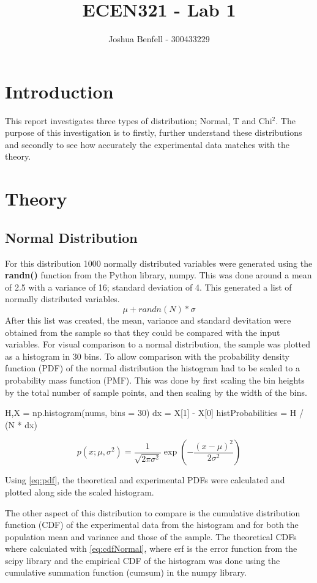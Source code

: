\documentclass[a4paper, 12pt]{article}
\title{ECEN321 - Lab 1}
\author{Joshua Benfell - 300433229}
\begin{document}
	\maketitle
    
    \section{Introduction}
        This report investigates three types of distribution; Normal, T and Chi$^2$. The purpose of this investigation is to firstly, further understand these distributions and secondly to see how accurately the experimental data matches with the theory.
    \section{Theory}
        \subsection{Normal Distribution} \label{sec:normalTheory}
            For this distribution 1000 normally distributed variables were generated using the \textbf{randn()} function from the Python library, numpy. This was done around a mean of 2.5 with a variance of 16; standard deviation of 4. This generated a list of normally distributed variables.
            $$
                \mu + randn(N) * \sigma
            $$
            After this list was created, the mean, variance and standard devitation were obtained from the sample so that they could be compared with the input variables. For visual comparison to a normal distribution, the sample was plotted as a histogram in 30 bins. To allow comparison with the probability density function (PDF) of the normal distribution the histogram had to be scaled to a probability mass function (PMF). This was done by first scaling the bin heights by the total number of sample points, and then scaling by the width of the bins.

            \begin{python}
H,X = np.histogram(nums, bins = 30)
dx = X[1] - X[0]
histProbabilities = H / (N * dx)
            \end{python}

            \begin{equation}\label{eq:pdf}
                p(x; \mu, \sigma^2) = \frac{1}{\sqrt{2 \pi \sigma^2}} \exp{\left(-\frac{(x-\mu)^2}{2\sigma^2}\right)}
            \end{equation}

            Using \cref{eq:pdf}, the theoretical and experimental PDFs were calculated and plotted along side the scaled histogram.
            \par
            The other aspect of this distribution to compare is the cumulative distribution function (CDF) of the experimental data from the histogram and for both the population mean and variance and those of the sample. The theoretical CDFs where calculated with \cref{eq:cdfNormal}, where erf is the error function from the scipy library and the empirical CDF of the histogram was done using the cumulative summation function (cumsum) in the numpy library.
\end{document}
